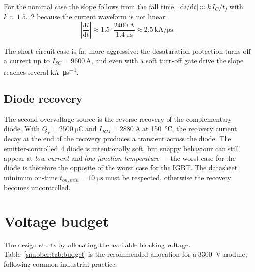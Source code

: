 For the nominal case the slope follows from the fall time,
$|\mathrm{d}i/\mathrm{d}t| \approx k\,I_C/t_f$ with $k \approx 1.5\ldots 2$
because the current waveform is not linear:
\begin{equation}
\left|\frac{\mathrm{d}i}{\mathrm{d}t}\right| \approx
1.5\cdot\frac{\SI{2400}{\ampere}}{\SI{1.4}{\micro\second}}
\approx \SI{2.5}{\kilo\ampere\per\micro\second}.
\end{equation}

The short-circuit case is far more aggressive: the desaturation protection
turns off a current up to $I_{SC}=\SI{9600}{\ampere}$, and even with a soft
turn-off gate drive the slope reaches several \si{\kilo\ampere\per\micro\second}.

\subsection{Diode recovery}

The second overvoltage source is the reverse recovery of the complementary
diode. With $Q_r = \SI{2500}{\micro\coulomb}$ and
$I_{RM} = \SI{2880}{\ampere}$ at \SI{150}{\celsius}, the recovery current
decay at the end of the recovery produces a transient across the diode.
The emitter-controlled~4 diode is intentionally soft, but snappy behaviour can
still appear at \emph{low current} and \emph{low junction temperature} --- the
worst case for the diode is therefore the opposite of the worst case for the
IGBT. The datasheet minimum on-time $t_{on,min}=\SI{10}{\micro\second}$ must
be respected, otherwise the recovery becomes uncontrolled.

\section{Voltage budget}

The design starts by allocating the available blocking voltage.
Table~\ref{snubber:tab:budget} is the recommended allocation for a \SI{3300}{\volt}
module, following common industrial practice.

